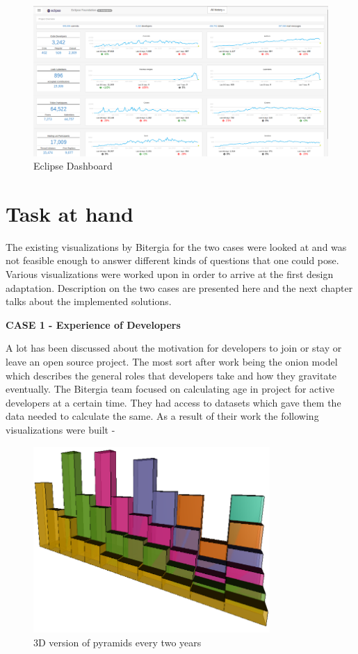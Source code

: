 \documentclass[seploa]{beavtex}
\begin{document}
\begin{figure}[H]
\centering
\includegraphics[width=120mm]{eclipse.png}
\caption{Eclipse Dashboard}
\end{figure}

\section{Task at hand}
The existing visualizations by Bitergia for the two cases were looked at and was not feasible enough to answer different kinds of questions that one could pose. Various visualizations were worked upon in order to arrive at the first design adaptation. Description on the two cases are presented here and the next chapter talks about the implemented solutions.

\textbf{CASE 1 - Experience of Developers}

A lot has been discussed about the motivation for developers to join or stay or leave an open source project. The most sort after work being the onion model which describes the general roles that developers take and how they gravitate eventually\cite{crowston2005,  kishida2003}. The Bitergia team focused on calculating age in project for active developers at a certain time. They had access to datasets which gave them the data needed to calculate the same. As a result of their work the following visualizations were built - 

\begin{figure}[!ht]
\centering
\includegraphics[width=90mm]{age2.png}
\caption{3D version of pyramids every two years}
\end{figure}
\end{document}
